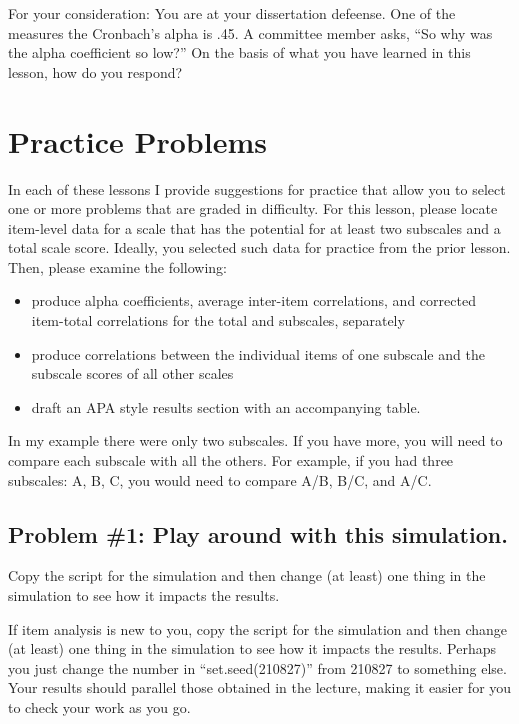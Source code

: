 \documentclass[
  english,
]{book}
\providecommand{\tightlist}{%
  \setlength{\itemsep}{0pt}\setlength{\parskip}{0pt}}
\begin{document}
For your consideration:
You are at your dissertation defeense. One of the measures the Cronbach's alpha is .45. A committee member asks, ``So why was the alpha coefficient so low?'' On the basis of what you have learned in this lesson, how do you respond?

\hypertarget{practice-problems-3}{%
\section{Practice Problems}\label{practice-problems-3}}

In each of these lessons I provide suggestions for practice that allow you to select one or more problems that are graded in difficulty. For this lesson, please locate item-level data for a scale that has the potential for at least two subscales and a total scale score. Ideally, you selected such data for practice from the prior lesson. Then, please examine the following:

\begin{itemize}
\tightlist
\item
  produce alpha coefficients, average inter-item correlations, and corrected item-total correlations for the total and subscales, separately
\item
  produce correlations between the individual items of one subscale and the subscale scores of all other scales
\item
  draft an APA style results section with an accompanying table.
\end{itemize}

In my example there were only two subscales. If you have more, you will need to compare each subscale with all the others. For example, if you had three subscales: A, B, C, you would need to compare A/B, B/C, and A/C.

\hypertarget{problem-1-play-around-with-this-simulation.-1}{%
\subsection{Problem \#1: Play around with this simulation.}\label{problem-1-play-around-with-this-simulation.-1}}

Copy the script for the simulation and then change (at least) one thing in the simulation to see how it impacts the results.

If item analysis is new to you, copy the script for the simulation and then change (at least) one thing in the simulation to see how it impacts the results. Perhaps you just change the number in ``set.seed(210827)'' from 210827 to something else. Your results should parallel those obtained in the lecture, making it easier for you to check your work as you go.
\end{document}
